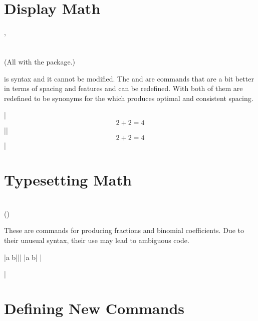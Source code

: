\NewCommandCopy{\oldsec}{\section}
\ExplSyntaxOff

\section{Display Math}
\instead{
\ai{\$\$}
} {
\csi{[}, \csi{]} \\
\\
\\
(All with the  package.)
}

\ai{\$\$} is  syntax and it cannot be modified. The
 and \csi{[} are  commands that are a bit better
in terms of spacing and features and can be redefined. With  both
of them are redefined to be synonyms for the  which produces
optimal and consistent spacing.

\chto|$$ 2 + 2 = 4 $$||\[ 2 + 2 = 4 \]| %

\section{Typesetting Math}
 {
   \\
   ()
}

These are  commands for producing fractions and binomial
coefficients. Due to their unusual syntax, their use may lead to ambiguous
code.
\begin{chktexignore}
\chto|{a \over b}|||
\chto|{a \choose b}|
|\usepackage{amsmath}
|
\end{chktexignore}

\section{Defining New Commands}\label{sec:def}
 {
   \\
   \\
}

